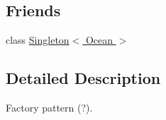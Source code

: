 \subsection*{Friends}
\begin{DoxyCompactItemize}
\item 
\hypertarget{classOcean_ae61b3a3c8247476add2d45d9cc4cb486}{
class \hyperlink{classOcean_ae61b3a3c8247476add2d45d9cc4cb486}{Singleton$<$ Ocean $>$}}
\label{classOcean_ae61b3a3c8247476add2d45d9cc4cb486}

\end{DoxyCompactItemize}


\subsection{Detailed Description}
Factory pattern (?). 

